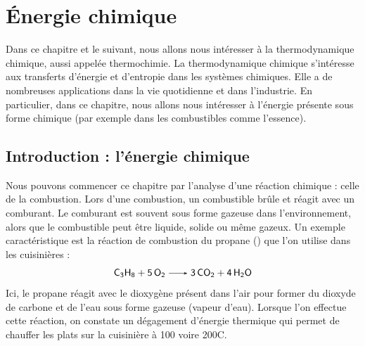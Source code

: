 \documentclass[11pt,fleqn]{book} %
\newcommand{\degC}{{\degree}C}
\begin{document}










\setcounter{chapter}{4}

\chapter{\'{E}nergie chimique}

Dans ce chapitre et le suivant, nous allons nous intéresser à la thermodynamique chimique, aussi appelée thermochimie. La thermodynamique chimique s'intéresse aux transferts d'énergie et d'entropie dans les systèmes chimiques. Elle a de nombreuses applications dans la vie quotidienne et dans l'industrie. En particulier, dans ce chapitre, nous allons nous intéresser à l'énergie présente sous forme chimique (par exemple dans les combustibles comme l'essence). 

\section{Introduction : l'énergie chimique}

Nous pouvons commencer ce chapitre par l'analyse d'une réaction chimique : celle de la combustion. Lors d'une combustion, un combustible brûle et réagit avec un comburant. Le comburant est souvent sous forme gazeuse dans l'environnement, alors que le combustible peut être liquide, solide ou même gazeux. Un exemple caractéristique est la réaction de combustion du propane () que l'on utilise dans les cuisinières :
\begin{equation}
    \ce{C3H8 + 5 O2 -> 3 CO2 + 4 H2O}
\end{equation}
Ici, le propane réagit avec le dioxygène présent dans l'air pour former du dioxyde de carbone et de l'eau sous forme gazeuse (vapeur d'eau). Lorsque l'on effectue cette réaction, on constate un dégagement d'énergie thermique qui permet de chauffer les plats sur la cuisinière à 100 voire 200\degC. 
\end{document}
